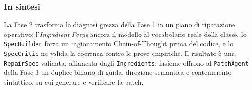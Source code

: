 \subsubsection{In sintesi}
La Fase 2 trasforma la diagnosi grezza della Fase 1 in un piano di riparazione operativo: l'\textit{Ingredient
Forge} ancora il modello al vocabolario reale della classe, lo \texttt{SpecBuilder} forza un ragionamento
Chain-of-Thought prima del codice, e lo \texttt{SpecCritic} ne valida la coerenza contro le prove empiriche. Il
risultato è una \texttt{RepairSpec} validata, affiancata dagli \texttt{Ingredients}: insieme offrono al
\texttt{PatchAgent} della Fase 3 un duplice binario di guida, direzione semantica e contenimento sintattico,
su cui generare e verificare la patch.

